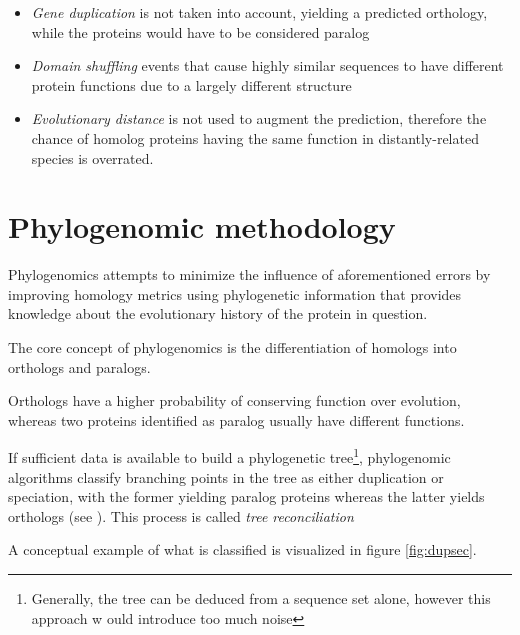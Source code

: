 \documentclass[pdftex,paper=A4,DIV=calc,titlepage,12pt]{scrartcl}
\newtheorem[L]{boxedDefinition}{Definition}
\begin{document}
\begin{itemize}
 \item \textit{Gene duplication} is not taken into account, yielding a predicted orthology, while the proteins would have to be considered paralog
 \item \textit{Domain shuffling} events that cause highly similar sequences to have different protein functions due to a largely different structure
 \item \textit{Evolutionary distance} is not used to augment the prediction, therefore the chance of homolog proteins having the same function in distantly-related species is overrated.
\end{itemize}

\section{Phylogenomic methodology}

Phylogenomics attempts to minimize the influence of aforementioned errors by improving homology metrics using phylogenetic information that provides knowledge about the evolutionary history of the protein in question.

The core concept of phylogenomics is the differentiation of homologs into orthologs and paralogs.

Orthologs have a higher probability of conserving function over evolution, whereas two proteins identified as paralog usually have different functions.

If sufficient data is available to build a phylogenetic tree\footnote{Generally, the tree can be deduced from a sequence set alone, however this approach w ould introduce too much noise}, phylogenomic algorithms classify branching points in the tree as either duplication  or speciation, with the former yielding paralog proteins whereas the latter yields orthologs (see \cite{eisen2003phylogenomics}). This process is called \textit{tree reconciliation}

A conceptual example of what is classified is visualized in figure \vref{fig:dupsec}.
\end{document}
